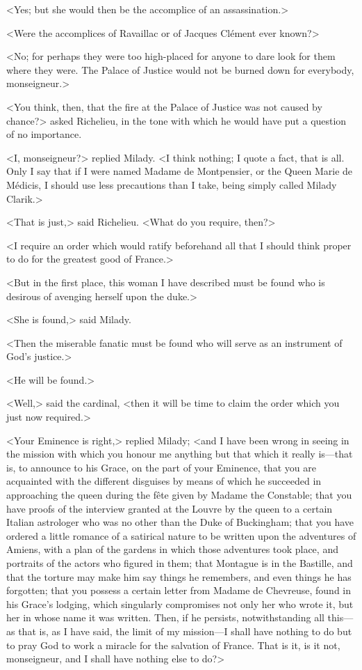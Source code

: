 <Yes; but she would then be the accomplice of an assassination.> 

<Were the accomplices of Ravaillac or of Jacques Clément ever known?> 

<No; for perhaps they were too high-placed for anyone to dare look for them where they were. The Palace of Justice would not be burned down for everybody, monseigneur.> 

<You think, then, that the fire at the Palace of Justice was not caused by chance?> asked Richelieu, in the tone with which he would have put a question of no importance. 

<I, monseigneur?> replied Milady. <I think nothing; I quote a fact, that is all. Only I say that if I were named Madame de Montpensier, or the Queen Marie de Médicis, I should use less precautions than I take, being simply called Milady Clarik.> 

<That is just,> said Richelieu. <What do you require, then?> 

<I require an order which would ratify beforehand all that I should think proper to do for the greatest good of France.> 

<But in the first place, this woman I have described must be found who is desirous of avenging herself upon the duke.> 

<She is found,> said Milady. 

<Then the miserable fanatic must be found who will serve as an instrument of God's justice.> 

<He will be found.> 

<Well,> said the cardinal, <then it will be time to claim the order which you just now required.> 

<Your Eminence is right,> replied Milady; <and I have been wrong in seeing in the mission with which you honour me anything but that which it really is—that is, to announce to his Grace, on the part of your Eminence, that you are acquainted with the different disguises by means of which he succeeded in approaching the queen during the fête given by Madame the Constable; that you have proofs of the interview granted at the Louvre by the queen to a certain Italian astrologer who was no other than the Duke of Buckingham; that you have ordered a little romance of a satirical nature to be written upon the adventures of Amiens, with a plan of the gardens in which those adventures took place, and portraits of the actors who figured in them; that Montague is in the Bastille, and that the torture may make him say things he remembers, and even things he has forgotten; that you possess a certain letter from Madame de Chevreuse, found in his Grace's lodging, which singularly compromises not only her who wrote it, but her in whose name it was written. Then, if he persists, notwithstanding all this—as that is, as I have said, the limit of my mission—I shall have nothing to do but to pray God to work a miracle for the salvation of France. That is it, is it not, monseigneur, and I shall have nothing else to do?> 

